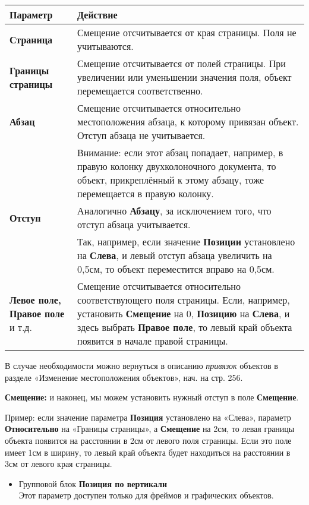 \documentclass[a4paper,10pt]{article}
\begin{document}
\begin{center}
\begin{tabular}{  m{4cm}  m{12cm}  }
 \textbf{Параметр} & \textbf{Действие}\\ 
 \hline
  \textbf{Страница} & Смещение отсчитывается от края страницы. Поля не учитываются.\\
  \textbf{Границы страницы} & Смещение отсчитывается от полей страницы. При увеличении или уменьшении значения поля, объект перемещается соответственно.\\ 
\textbf{Абзац} & Смещение отсчитывается относительно местоположения абзаца, к которому привязан объект. Отступ абзаца не учитывается.\\
\textbf{} & Внимание: если этот абзац попадает, например, в правую колонку двухколоночного документа, то объект, прикреплённый к этому абзацу, тоже перемещается в правую колонку.\\
\textbf{Отступ} & Аналогично \textbf{Абзацу}, за исключением того, что отступ абзаца учитывается.\\
\textbf{} & Так, например, если значение \textbf{Позиции} установлено на \textbf{Слева}, и левый отступ абзаца увеличить на 0,5см, то объект переместится вправо на 0,5см.\\
\textbf{Левое поле, Правое поле} и т.д. & Смещение отсчитывается относительно соответствующего поля страницы. Если, например, установить \textbf{Смещение} на 0, \textbf{Позицию} на \textbf{Слева}, и здесь выбрать \textbf{Правое поле}, то левый край объекта появится в начале правой страницы.
\end{tabular}
\end{center}

В случае необходимости можно вернуться в описанию \textit{привязок} объектов в разделе «Изменение местоположения объектов», нач. на стр. 256.

\textbf{Смещение:} и наконец, мы можем установить нужный отступ в поле \textbf{Смещение}.

Пример: если значение параметра \textbf{Позиция} установлено на «Слева», параметр \textbf{Относительно} на «Границы страницы», а \textbf{Смещение} на 2см, то левая границы объекта появится на расстоянии в 2см от левого поля страницы. Если это поле имеет 1см в ширину, то левый край объекта будет находиться на расстоянии в 3см от левого края страницы.

\begin{itemize}
 \item Групповой блок \textbf{Позиция по вертикали}\\
 Этот параметр доступен только для фреймов и графических объектов.
 \end{itemize}
 
\end{document}
